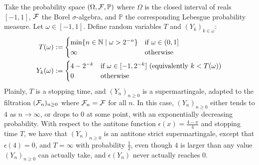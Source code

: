 \begin{example}
 

Take the probability space $(\Omega, \mathcal{F}, \mathbb{P})$ where $\Omega$ is the closed interval of reals $[-1, 1]$, $\mathcal{F}$ the Borel $\sigma$-algebra, and $\mathbb{P}$ the corresponding Lebesgue probability measure.
Let $\omega \in [-1, 1]$. Define random variables $T$ and $(Y_k)_{k \in \omega}$:
\begin{align*}
T(\omega) & := 
\begin{cases}
\min\{n \in \mathbb{N} \mid \omega > 2^{-n}\} & \hbox{if $\omega \in (0, 1]$}\\
\infty & \hbox{otherwise}
\end{cases} 
\\
Y_k(\omega) & := 
\begin{cases}
4-2^{-k} & \hbox{if $\omega \in [-1, 2^{-k}]$ (equivalently $k < T(\omega)$)}\\
0 & \hbox{otherwise}
\end{cases} 
\end{align*}
\lo{N.B.~$\set{T = n} = (\frac{1}{2^{n}}, \frac{1}{2^{n-1}}]$, and so, $\set{T > n} = [-1, \frac{1}{2^n}]$.}
Plainly, $T$ is a stopping time, and $(Y_n)_{n \geq 0}$ is a supermartingale, adapted to the filtration $(\mathcal{F}_n)_{n \geq 0}$ where $\mathcal{F}_n = \mathcal{F}$ for all $n$. 
In this case, $(Y_n)_{n \geq 0}$ either tends to $4$ as $n \to \infty$, or drops to 0 at some point, with an exponentially decreasing probability. 
With respect to the antitone function $\epsilon(x) = \frac{4-x}{4}$ and stopping time $T$, we have that $(Y_n)_{n \geq 0}$ is an antitone strict supermartingale, except that $\epsilon(4) = 0$, and $T = \infty$ with probability $\frac 1 2$, even though $4$ is larger than any value $(Y_n)_{n \geq 0}$ can actually take, and $\epsilon(Y_n)$ never actually reaches $0$.
\end{example}

